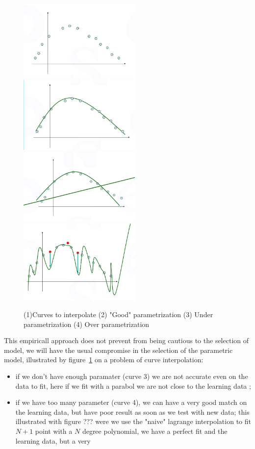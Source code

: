 \begin{figure}
\centering
\includegraphics[width=6cm]{Methods/Images/Courbe-Pts.jpg}
\includegraphics[width=6cm]{Methods/Images/CourbeGoodParam.jpg}\\
\includegraphics[width=6cm]{Methods/Images/Courbe-UndeParam.jpg}
\includegraphics[width=6cm]{Methods/Images/CourbeOverParam.jpg}
	\caption{(1)Curves to interpolate (2) "Good" parametrization (3) Under parametrization (4) Over parametrization}
	\label{fig:CurvesParam}
\end{figure}


This empiricall approach does not prevent from being cautious
to the selection of model, we will have the usual compromise in the selection
of the parametric model, illustrated by figure~\ref{fig:CurvesParam}  on a problem of curve interpolation:


\begin{itemize}
	\item if we don't have enough paramater (curve 3) we are not accurate  even on the data to fit,
	   here if we fit with a parabol we are not close to the learning data ;

   \item if we  have too many parameter (curve 4), we can have a very good match on the learning data, but have 
	 poor result as soon as we test with new data; this illustrated with  figure ??? were
         we use the "naive" lagrange interpolation to fit $N+1$ point with a $N$ degree polynomial,
         we have a perfect fit and the learning data, but a very
\end{itemize}

